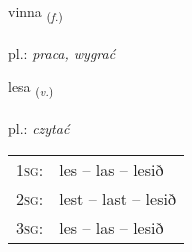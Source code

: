 \documentclass[frontgrid, backgrid]{flacards}\usepackage[]{graphicx}\usepackage[]{xcolor}
\begin{document}
\renewcommand{\flhead}{\vskip5pt \fboxsep=0pt {\small\bfseries\footnotesize Nafnorð | Noun}}
\renewcommand{\fcfoot}{\vskip5pt \fboxsep=0pt \hspace{2pt}{\small\bfseries\footnotesize 1K}}

\renewcommand{\blhead}{\vskip5pt {\small\bfseries\footnotesize Nafnorð | Noun }}
\renewcommand{\bcfoot}{\vskip5pt \hspace{2pt}{\small\bfseries\footnotesize 1K}}


{vinna \small{\textsubscript{(\textit{f.})}} \\[1ex] %
\textphonetic{[vɪna]} \\
pl.: \emph{praca, wygrać} \\  [2ex]
\renewcommand*{\arraystretch}{0.8}
}

\renewcommand{\flhead}{\vskip5pt \fboxsep=0pt {\small\bfseries\footnotesize Sagnorð | Verb}}
\renewcommand{\fcfoot}{\vskip5pt \fboxsep=0pt \hspace{2pt}{\small\bfseries\footnotesize 1K}}

\renewcommand{\blhead}{\vskip5pt {\small\bfseries\footnotesize Sagnorð | Verb }}
\renewcommand{\bcfoot}{\vskip5pt \hspace{2pt}{\small\bfseries\footnotesize 1K}}


{lesa \small{\textsubscript{(\textit{v.})}} \\[1ex] %
\textphonetic{[lɛːsa]} \\
pl.: \emph{czytać} \\  [2ex]
\renewcommand*{\arraystretch}{0.8}
\begin{tabular}{p{1cm}l}
\textsc{1sg}: & les -- las -- lesið \\ 
\textsc{2sg}: & lest -- last -- lesið \\ 
\textsc{3sg}: & les -- las -- lesið \\ 
\end{tabular}
}
\end{document}
